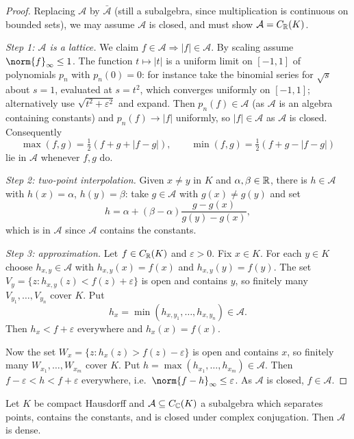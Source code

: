 \documentclass[a4paper]{scrartcl}
\begin{document}
\begin{proof}
	Replacing $\mathcal A$ by $\bar{\mathcal A}$ (still a subalgebra, since multiplication is continuous on bounded sets), we may assume $\mathcal{A}$ is closed, and must show $\mathcal{A} = C_{\mathbb{R}}(K)$.

	\emph{Step 1: $\mathcal A$ is a lattice.} We claim $f \in \mathcal{A} \Rightarrow |f| \in \mathcal{A}$. By scaling assume $\norm{f}_\infty \leq 1$. The function $t \mapsto |t|$ is a uniform limit on $[-1,1]$ of polynomials $p_n$ with $p_n(0)=0$: for instance take the binomial series for $\sqrt{s}$ about $s=1$, evaluated at $s = t^2$, which converges uniformly on $[-1,1]$; alternatively use $\sqrt{t^2 + \varepsilon^2}$ and expand. Then $p_n(f) \in \mathcal A$ (as $\mathcal A$ is an algebra containing constants) and $p_n(f)\to|f|$ uniformly, so $|f| \in \mathcal A$ as $\mathcal A$ is closed. Consequently
	$$\max(f,g) = \tfrac12(f+g+|f-g|), \qquad \min(f,g)=\tfrac12(f+g-|f-g|)$$
	lie in $\mathcal{A}$ whenever $f, g$ do.

	\emph{Step 2: two-point interpolation.} Given $x \neq y$ in $K$ and $\alpha,\beta \in \mathbb{R}$, there is $h \in \mathcal{A}$ with $h(x)=\alpha$, $h(y)=\beta$: take $g \in \mathcal{A}$ with $g(x)\neq g(y)$ and set
	$$h = \alpha + (\beta-\alpha)\frac{g - g(x)}{g(y)-g(x)},$$
	which is in $\mathcal{A}$ since $\mathcal A$ contains the constants.

	\emph{Step 3: approximation.} Let $f \in C_{\mathbb{R}}(K)$ and $\varepsilon > 0$. Fix $x \in K$. For each $y \in K$ choose $h_{x,y}\in\mathcal{A}$ with $h_{x,y}(x)=f(x)$ and $h_{x,y}(y)=f(y)$. The set $V_y = \{z : h_{x,y}(z) < f(z)+\varepsilon\}$ is open and contains $y$, so finitely many $V_{y_1},\dots,V_{y_n}$ cover $K$. Put
	$$h_x = \min(h_{x,y_1},\dots,h_{x,y_n}) \in \mathcal{A}.$$
	Then $h_x < f + \varepsilon$ everywhere and $h_x(x)=f(x)$.

	Now the set $W_x = \{z : h_x(z) > f(z)-\varepsilon\}$ is open and contains $x$, so finitely many $W_{x_1},\dots,W_{x_m}$ cover $K$. Put $h = \max(h_{x_1},\dots,h_{x_m}) \in \mathcal{A}$. Then $f - \varepsilon < h < f+\varepsilon$ everywhere, i.e.\ $\norm{f-h}_\infty \leq \varepsilon$. As $\mathcal A$ is closed, $f \in \mathcal{A}$.
\end{proof}

\begin{theorem}
	Let $K$ be compact Hausdorff and $\mathcal{A}\subseteq C_{\mathbb{C}}(K)$ a subalgebra which separates points, contains the constants, and is closed under complex conjugation. Then $\mathcal{A}$ is dense.
\end{theorem}
\end{document}
